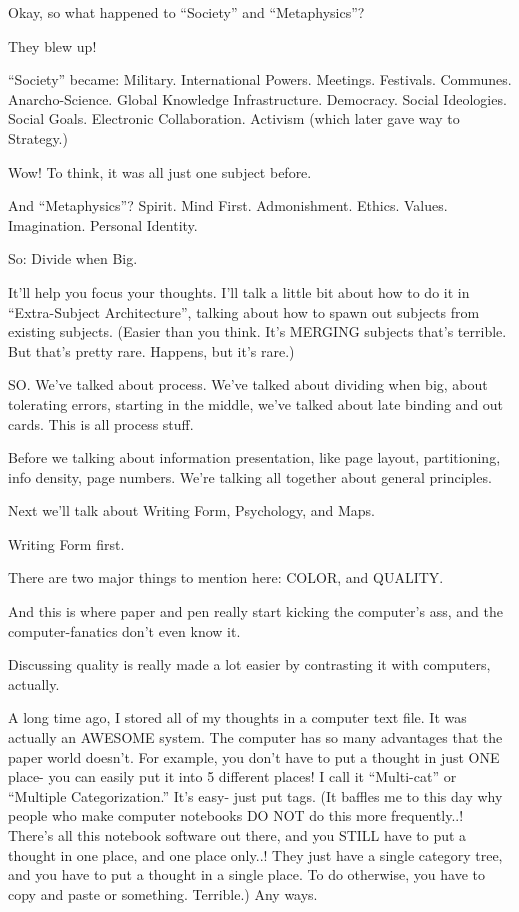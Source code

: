 \documentclass[oneside]{book}
\begin{document}
Okay, so what happened to ``Society'' and ``Metaphysics''?

They blew up!

``Society'' became: Military. International
Powers. Meetings. Festivals. Communes. Anarcho-Science. Global
Knowledge Infrastructure. Democracy. Social Ideologies. Social
Goals. Electronic Collaboration. Activism (which later gave way to
Strategy.)

Wow! To think, it was all just one subject before.

And ``Metaphysics''? Spirit. Mind
First. Admonishment. Ethics. Values. Imagination. Personal Identity.

So: Divide when Big.

It'll help you focus your thoughts. I'll talk a little bit about how
to do it in ``Extra-Subject Architecture'', talking about how to spawn
out subjects from existing subjects. (Easier than you think. It's
MERGING subjects that's terrible. But that's pretty rare. Happens, but
it's rare.)

SO. We've talked about process. We've talked about dividing when big,
about tolerating errors, starting in the middle, we've talked about
late binding and out cards. This is all process stuff.

Before we talking about information presentation, like page layout,
partitioning, info density, page numbers. We're talking all together
about general principles.

Next we'll talk about Writing Form, Psychology, and Maps.

Writing Form first.

There are two major things to mention here: COLOR, and QUALITY.

And this is where paper and pen really start kicking the computer's
ass, and the computer-fanatics don't even know it.

Discussing quality is really made a lot easier by contrasting it with
computers, actually.

A long time ago, I stored all of my thoughts in a computer text
file. It was actually an AWESOME system. The computer has so many
advantages that the paper world doesn't. For example, you don't have
to put a thought in just ONE place- you can easily put it into 5
different places! I call it ``Multi-cat'' or ``Multiple Categorization.''
It's easy- just put tags. (It baffles me to this day why people who
make computer notebooks DO NOT do this more frequently..! There's all
this notebook software out there, and you STILL have to put a thought
in one place, and one place only..! They just have a single category
tree, and you have to put a thought in a single place. To do
otherwise, you have to copy and paste or something. Terrible.) Any
ways.
\end{document}
